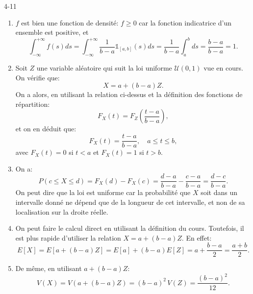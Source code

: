 \begin{corrige}{4-11}

\begin{enumerate}

\item $f$ est bien une fonction de densit\'e: $f\geq0$ car la fonction indicatrice d'un ensemble est positive, et 
$$
\int_{-\infty}^{+\infty} f(s) ds =
\int_{-\infty}^{+\infty} \frac1{b-a} \mathds{1}_{[a,b]} (s) ds =
\frac1{b-a} \int_a^b ds = \frac{b-a}{b-a} = 1.
$$

\item Soit $Z$ une variable al\'eatoire qui suit la loi uniforme $\mathcal{U}(0,1)$ vue en cours. On v\'erifie que:
$$ 
X = a + (b-a) Z.
$$
On a alors, en utilisant la relation ci-dessus et la d\'efinition des fonctions de r\'epartition:
$$
F_X (t) = F_Z \left ( \frac{t-a}{b-a} \right ),
$$
et on en d\'eduit que:
$$
F_X (t) = \frac{t-a}{b-a}, \quad a\leq t \leq b,
$$
avec $F_X(t)=0$ si $t<a$ et $F_X(t)=1$ si $t>b$.

\item On a:
$$
P ( c \leq X \leq d ) = F_X(d) - F_X(c) = \frac{d-a}{b-a} - \frac{c-a}{b-a} = \frac{d - c}{b-a}.
$$
On peut dire que la loi est uniforme car la probabilit\'e que $X$ soit dans un intervalle donn\'e ne d\'epend que de la longueur de cet intervalle, et non de sa localisation sur la droite r\'eelle.

\item On peut faire le calcul direct en utilisant la d\'efinition du cours. Toutefois, il est plus rapide d'utiliser la relation $X = a + (b-a) Z$. En effet:
$$
E[X] = E [ a + (b-a) Z ] = E [ a ] + (b-a) E [ Z ] = a + \frac{b-a}2 = \frac{a+b}2.
$$

\item De m\^eme, en utilisant $a + (b-a) Z$:
$$
V(X) = V ( a + (b-a) Z ) = (b-a)^2 \, V(Z) = \frac{(b-a)^2}{12}.
$$

\end{enumerate}

\end{corrige}
